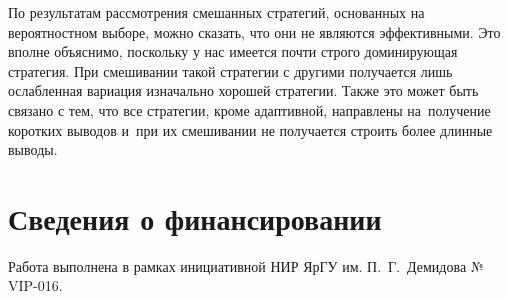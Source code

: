 \documentclass{csmathnotes}
\begin{document}
По результатам рассмотрения смешанных стратегий, основанных на вероятностном выборе, можно сказать, что они не являются эффективными. Это вполне объяснимо, поскольку у нас имеется почти строго доминирующая стратегия. При смешивании такой стратегии с другими получается лишь ослабленная вариация изначально хорошей стратегии. Также это может быть связано с тем, что все стратегии, кроме адаптивной, направлены на~получение коротких выводов и~при их смешивании не получается строить более длинные выводы.

\section*{Сведения о финансировании}
Работа выполнена в рамках инициативной НИР ЯрГУ им. П.~Г.~Демидова № VIP-016.

\printbibliography
\end{document}
